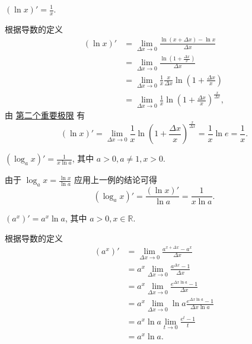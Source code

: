 \documentclass[cn,toc=twocol]{elegantbook}
\newcommand{\R}{\mathbb{R}}
\begin{document}
\vspace{0.8em}

\begin{example}
	$(\ln x)' = \frac{1}{x}$.
\end{example}
\begin{solution}
	根据导数的定义
	\[
	\begin{aligned}
		(\ln x)' &= \lim_{\Delta x \to 0} \frac{\ln (x + \Delta x) - \ln x}{\Delta x}\\
		&= \lim_{\Delta x \to 0} \frac{\ln \left(1 + \frac{\Delta x}{x}\right)}{\Delta x}\\
		&= \lim_{\Delta x \to 0} \frac{1}{x}\frac{x}{\Delta x}\ln \left(1 + \frac{\Delta x}{x}\right)\\
		&= \lim_{\Delta x \to 0} \frac{1}{x}\ln \left(1 + \frac{\Delta x}{x}\right)^{\frac{x}{\Delta x}},
	\end{aligned}
	\]
	由 \hyperref[thm:Ilimit2]{第二个重要极限} 有
	\[
	(\ln x)' = \lim_{\Delta x \to 0} \frac{1}{x}\ln \left(1 + \frac{\Delta x}{x}\right)^{\frac{x}{\Delta x}} = \frac{1}{x} \ln e = \frac{1}{x}.
	\]
\end{solution}

\vspace{0.8em}

\begin{example}
	$(\log_a x)' = \frac{1}{x \ln a}$, 其中 $a > 0, a \neq 1, x > 0$.
\end{example}
\begin{solution}
	由于 $\log_a x = \frac{\ln x}{\ln a}$ 应用上一例的结论可得
	\[
		(\log_a x)' = \frac{(\ln x)'}{\ln a} = \frac{1}{x \ln a}.
	\]
\end{solution}

\vspace{0.8em}

\begin{example}
	$(a^x)' = a^x \ln a$, 其中 $a > 0, x \in \R$.
\end{example}
\begin{solution}
	根据导数的定义
	\[
	\begin{aligned}
		(a^x)' &= \lim_{\Delta x \to 0} \frac{a^{x + \Delta x} - a^x}{\Delta x}\\
		&= a^x \lim_{\Delta x \to 0} \frac{a^{\Delta x} - 1}{\Delta x}\\
		&= a^x \lim_{\Delta x \to 0} \frac{e^{\Delta x \ln a} - 1}{\Delta x}\\
		&= a^x \lim_{\Delta x \to 0} \ln a \frac{e^{\Delta x \ln a} - 1}{\Delta x \ln a}\\
		&= a^x \ln a \lim_{t \to 0} \frac{e^{t} - 1}{t}\\
		&= a^x \ln a.
	\end{aligned}
	\]
\end{solution}
\end{document}
